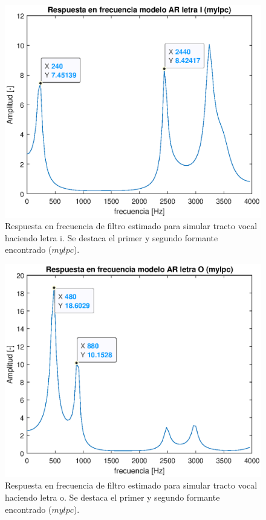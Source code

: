 \begin{figure}[H]
    \centering
    \includegraphics[width = .8\linewidth]{figures/p1_4i.eps}
    \caption{Respuesta en frecuencia de filtro estimado para simular tracto vocal haciendo letra i. Se destaca el primer y segundo formante encontrado ($mylpc$).}
    \label{fig:p1_4i}
\end{figure}

\begin{figure}[H]
    \centering
    \includegraphics[width = .8\linewidth]{figures/p1_4o.eps}
    \caption{Respuesta en frecuencia de filtro estimado para simular tracto vocal haciendo letra o. Se destaca el primer y segundo formante encontrado ($mylpc$).}
    \label{fig:p1_4o}
\end{figure}

